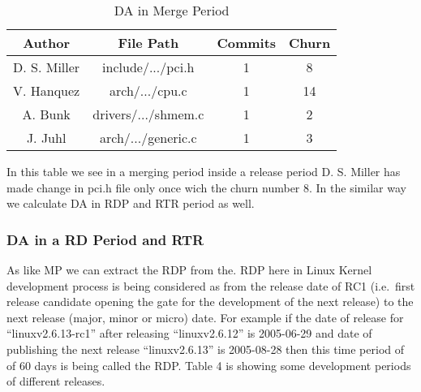\documentclass{acm_proc_article-sp}
\begin{document}
\begin{table}[ht]
\caption{DA in Merge Period}  %
\centering 						%
\begin{tabular}{c c c c}				%
\hline\hline						%
Author		& File Path			& Commits		& Churn \\ [0.5ex]
\hline 							%
D. S. Miller	& include/.../pci.h		& 1				& 8 \\
V. Hanquez	& arch/.../cpu.c		& 1				& 14 \\
A. Bunk		& drivers/.../shmem.c	& 1				& 2 \\
J. Juhl		& arch/.../generic.c		& 1				& 3 \\
[1ex]							%
\hline 							%
\end{tabular}
\label{table:nonlin} 				%
\end{table}

In this table we see in a merging period inside a release period D. S. Miller has made change in pci.h file only once wich the churn number 8. In the similar way we calculate DA in RDP and RTR period as well.

\subsubsection{DA in a RD Period and RTR}
As like MP we can extract the RDP from the. RDP here in Linux Kernel development process is being considered as from the release date of RC1 (i.e.\ first release candidate opening the gate for the development of the next release) to the next release (major, minor or micro) date. For example if the date of release for ``linuxv2.6.13-rc1'' after releasing ``linuxv2.6.12''  is 2005-06-29 and date of publishing the next release ``linuxv2.6.13'' is 2005-08-28 then this time period of of 60 days is being called the RDP. Table 4 is showing some development periods of different releases.
\end{document}
